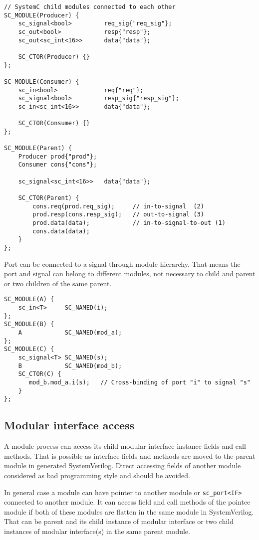 \begin{lstlisting}[style=mycpp]
// SystemC child modules connected to each other
SC_MODULE(Producer) {
    sc_signal<bool>         req_sig{"req_sig"};
    sc_out<bool>            resp{"resp"};
    sc_out<sc_int<16>>      data{"data"};
    
    SC_CTOR(Producer) {}
};

SC_MODULE(Consumer) {
    sc_in<bool>             req{"req"};
    sc_signal<bool>         resp_sig{"resp_sig"};
    sc_in<sc_int<16>>       data{"data"};
    
    SC_CTOR(Consumer) {}
};

SC_MODULE(Parent) {
    Producer prod{"prod"};
    Consumer cons{"cons"};
    
    sc_signal<sc_int<16>>   data{"data"};

    SC_CTOR(Parent) {
        cons.req(prod.req_sig);     // in-to-signal  (2)
        prod.resp(cons.resp_sig);   // out-to-signal (3)       
        prod.data(data);            // in-to-signal-to-out (1)
        cons.data(data);
    }
};
\end{lstlisting}

Port can be connected to a signal through module hierarchy. That means the port and signal can belong to different modules, not necessary to child and parent or two children of the same parent.

\begin{lstlisting}[style=mycpp]
SC_MODULE(A) {
    sc_in<T>     SC_NAMED(i);     
};
SC_MODULE(B) {
    A            SC_NAMED(mod_a);
};
SC_MODULE(C) {
    sc_signal<T> SC_NAMED(s);
    B            SC_NAMED(mod_b);
    SC_CTOR(C) {
       mod_b.mod_a.i(s);   // Cross-binding of port "i" to signal "s"
    } 
};
\end{lstlisting}


\subsection{Modular interface access}

A module process can access its child modular interface instance fields and call methods. That is possible as interface fields and methods are moved to the parent module in generated SystemVerilog. Direct accessing fields of another module considered as bad programming style and should be avoided. 

In general case a module can have pointer to another module or {\tt sc\_port<IF>} connected to another module. It can access field and call methods of the pointee module if both of these modules are flatten in the same module in SystemVerilog. That can be parent and its child instance of modular interface or two child instances of modular interface(s) in the same parent module.

